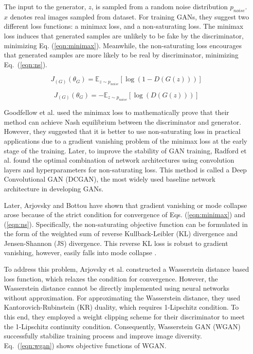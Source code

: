 \documentclass[runningheads]{llncs}
\begin{document}
The input to the generator, $z$, is sampled from a random noise distribution $p_{noise}$. $x$ denotes real images sampled from dataset. For training GANs, they suggest two different loss functions: a minimax loss, and a non-saturating loss. The minimax loss induces that generated samples are unlikely to be fake by the discriminator, minimizing Eq. (\ref{eqn:minimax}). Meanwhile, the non-saturating loss encourages that generated samples are more likely to be real by discriminator, minimizing Eq.~(\ref{eqn:ns}). 

\begin{equation}
    J_{(G)}(\theta_{G})=
    \mathbb{E}_{z\sim p_{noise}}[\log{(1-D(G(z)))}]\label{eqn:minimax}
\end{equation}

\vspace*{-4mm}
\begin{equation}
    J_{(G)}(\theta_{G})=
    -\mathbb{E}_{z\sim p_{noise}}[\log{(D(G(z)))}]\label{eqn:ns}
\end{equation}

Goodfellow et al. \cite{goodfellow2014generative} used the minimax loss to mathematically prove that their method can achieve Nash equilibrium between the discriminator and generator. However, they suggested that it is better to use non-saturating loss in practical applications due to a gradient vanishing problem of the minimax loss at the early stage of the training. Later, to improve the stability of GAN training, Radford et al. \cite{radford2015unsupervised} found the optimal combination of network architectures using convolution layers and hyperparameters for non-saturating loss. This method is called a Deep Convolutional GAN (DCGAN), the most widely used baseline network architecture in developing GANs.

Later, Arjovsky and Bottou \cite{arjovsky2017towards} have shown that gradient vanishing or mode collapse arose because of the strict condition for convergence of Eqs. (\ref{eqn:minimax}) and (\ref{eqn:ns}). Specifically, the non-saturating objective function can be formulated in the form of the weighted sum of reverse Kullback-Leibler (KL) divergence and Jensen-Shannon (JS) divergence. This reverse KL loss is robust to gradient vanishing, however, easily falls into mode collapse \cite{arjovsky2017towards}. 

To address this problem, Arjovsky et al. \cite{arjovsky2017wasserstein} constructed a Wasserstein distance based loss function, which relaxes the condition for convergence. However, the Wasserstein distance cannot be directly implemented using neural networks without approximation. For approximating the Wasserstein distance, they used Kantorovich-Rubinstein (KR) duality, which requires 1-Lipschitz condition. To this end, they employed a weight clipping scheme for their discriminator to meet the 1-Lipschitz continuity condition. Consequently, Wasserstein GAN (WGAN) successfully stabilize training process and improve image diversity. Eq.~(\ref{eqn:wgan}) shows objective functions of WGAN.
\end{document}
